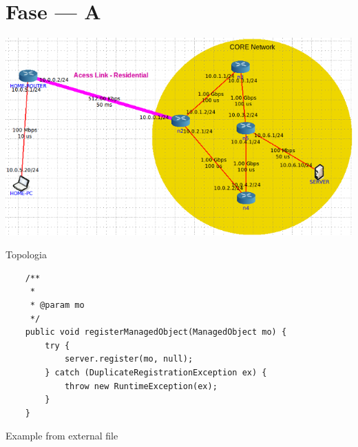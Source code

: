 \section{Fase --- A}

\begin{center}
 	
 	\includegraphics[width=\textwidth,height=\textheight,keepaspectratio]{resources/images/Alinea1/topologia.png}
 	\captionsetup{type=figure, width=0.8\linewidth}
	\caption{Topologia}
\label{fig:ssec1:topologia} 
\end{center}



\begin{listing}
\begin{verbatim}
	/**
	 * 
	 * @param mo
	 */
	public void registerManagedObject(ManagedObject mo) {
		try {
			server.register(mo, null);
		} catch (DuplicateRegistrationException ex) {
			throw new RuntimeException(ex);
		}
	}
\end{verbatim}
\caption{Example from external file}
\label{listing:3}
\end{listing}









